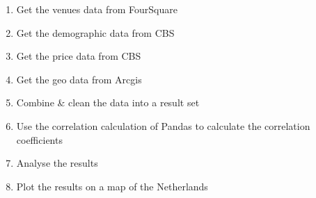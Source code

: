 \medskip
\begin{enumerate}
	\item Get the venues data from FourSquare
	\item Get the demographic data from CBS
	\item Get the price data from CBS
	\item Get the geo data from Arcgis
	\item Combine \& clean the data into a result set
	\item Use the correlation calculation of Pandas to calculate the correlation coefficients
	\item Analyse the results
	\item Plot the results on a map of the Netherlands
\end{enumerate}
\medskip
